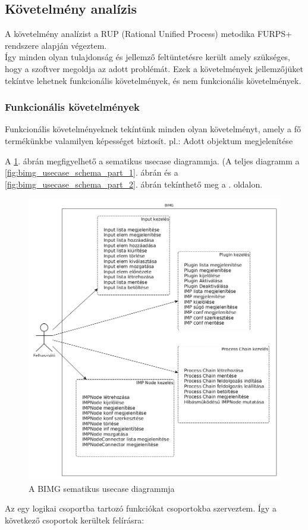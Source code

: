 \documentclass[a4paper,12pt,oneside]{report}
\begin{document}
\subsection{Követelmény analízis}
A követelmény analízist a RUP (Rational Unified Process) metodika FURPS+ rendszere alapján végeztem.\\Így minden olyan tulajdonság és jellemző feltüntetésre került amely szükséges, hogy a szoftver megoldja az adott problémát. \cite{website:soft_req_def} Ezek a követelmények jellemzőjüket tekíntve lehetnek funkcionális követelmények, és nem funkcionális követelmények.

\subsubsection{Funkcionális követelmények}
Funkcionális követelményeknek tekíntünk minden olyan követelményt, amely a fő termékünkbe valamilyen képességet biztosít. pl.: Adott objektum megjelenítése \cite{website:soft_func_req_ibm}

A \ref{fig:bimg_usecase_schema}. ábrán megfigyelhető a sematikus usecase diagrammja. (A teljes diagramm a \ref{fig:bimg_usecase_schema_part_1}. ábrán és a \ref{fig:bimg_usecase_schema_part_2}. ábrán tekínthető meg a \pageref{fig:bimg_usecase_schema_part_1}. oldalon.
\begin{figure}[h]
  \includegraphics[width=\textwidth]{schematic_usecase.png}
  \caption{A BIMG sematikus usecase diagrammja}
  \label{fig:bimg_usecase_schema}
\end{figure}
Az egy logikai csoportba tartozó funkciókat csoportokba szerveztem. Így a következő csoportok kerültek felírásra:
\end{document}
